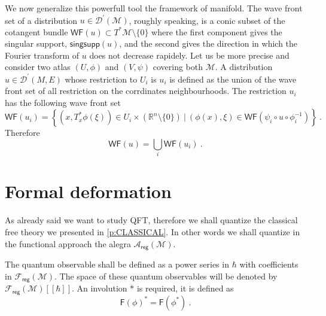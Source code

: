 \documentclass[12pt]{book}
\newcommand{\singsupp}{\mathsf{singsupp}}
\newcommand{\WF}{\mathsf{WF}}
\newcommand{\reg}{\mathsf{reg}}
\newcommand{\Acal}{\mathcal{A}}
\newcommand{\Dcal}{\mathcal{D}}
\newcommand{\Fcal}{\mathcal{F}}
\newcommand{\Mcal}{\mathcal{M}}
\newcommand{\Rbb}{\mathbb{R}}
\newcommand{\Fsf}{\mathsf{F}}
\theoremstyle{break}
\begin{document}
We now generalize this powerfull tool the framework of manifold. The wave front set of a distribution $u \in \Dcal^\prime(\Mcal)$, roughly speaking, is a conic subset of the cotangent bundle $\WF(u) \subset T^\ast\Mcal\setminus\{0\}$ where the first component gives the singular support, $\singsupp(u)$, and the second gives the direction in which the Fourier transform of $u$ does not decrease rapidely. Let us be more precise and consider two atlas ${(U,\phi)}$ and ${(V,\psi)}$ covering both $\Mcal$. A distribution $u\in\Dcal^\prime(M,E)$ whose restriction to $U_i$ is $u_i$ is defined as the union of the wave front set of all restriction on the corrdinates neighbourhoods. The restriction $u_i$ has the following wave front set
%
\begin{equation*}
\WF(u_i) = \left\{ \left( x,T_x^\ast\phi(\xi) \right) \in U_i \times \left( \Rbb^n \setminus \{0\} \right) \ | \ \left( \phi(x) , \xi \right) \in \WF\left( \psi_i \circ u \circ \phi_i^{-1} \right) \right\} \ . 
\end{equation*}
%
Therefore
%
\begin{equation*}
\WF(u) = \bigcup_i \WF(u_i) \ . 
\end{equation*}


\section{Formal deformation}\label{p:Q_DEFORM}


As already said we want to study QFT, therefore we shall quantize the classical free theory we presented in \ref{p:CLASSICAL}. In other words we shall quantize in the functional approach the alegra $\Acal_\reg(\Mcal)$.




The quantum observable shall be defined as a power series in $\hbar$ with coefficients in $\Fcal_\reg(\Mcal)$. The space of these quantum observables will be denoted by $\Fcal_\reg(\Mcal)[[\hbar]]$. An involution $\ast$ is required, it is defined as 
%
\begin{equation*}
\Fsf(\phi)^\ast =  \Fsf(\phi^\ast) \ .
\end{equation*}


\end{document}
